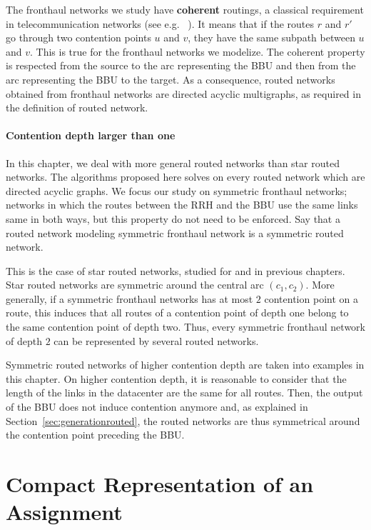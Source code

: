   
The fronthaul networks we study have \textbf{coherent} routings, a classical 
requirement in telecommunication networks (see e.g. ~\cite{schwiebert1996necessary}). It means that
if the routes $r$ and $r'$ go through two contention points $u$ and $v$, they have the same subpath
between $u$ and $v$.
This is true for the fronthaul networks we modelize. The coherent property is respected from the source 
to the arc representing the BBU and then from the arc representing the BBU to the target.
 As a consequence, routed networks obtained from fronthaul networks are directed acyclic multigraphs, as required in the definition of routed network.


\paragraph*{Contention depth larger than one}

In this chapter, we deal with more general routed networks than star routed networks. The algorithms proposed here solves \spall on every routed network which are directed acyclic graphs. We focus our study on symmetric fronthaul networks; networks in which the routes between the RRH and the BBU use the same links same in both ways, but this property do not need to be enforced. Say that a routed network modeling symmetric fronthaul network is a symmetric routed network.

This is the case of star routed networks, studied for \pazl and \pall in previous chapters. Star routed networks are symmetric around the central arc $(c_1,c_2)$. More generally, if a symmetric fronthaul networks has at most $2$ contention point on a route, this induces that all routes of a contention point of depth one belong to the same contention point of depth two. Thus, every symmetric fronthaul network of depth $2$ can be represented by several routed networks.

Symmetric routed networks of higher contention depth are taken into examples in this chapter. On higher contention depth, it is reasonable to consider that the length of the links in the datacenter are the same for all routes. Then, the output of the BBU does not induce contention anymore and, as explained in Section~\ref{sec:generationrouted}, the routed networks are thus symmetrical around the contention point preceding the BBU. 

\section{Compact Representation of an Assignment}

